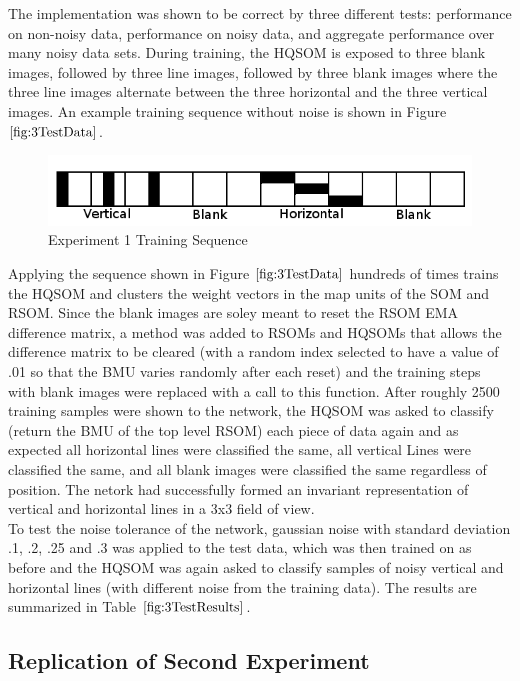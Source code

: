 \documentclass[a4paper,10pt]{article}
\begin{document}
The implementation was shown to be correct by three different tests: performance on non-noisy
data, performance on noisy data, and aggregate performance over many noisy data sets. During
training, the HQSOM is exposed to three blank images, followed by three line images, followed by
three blank images where the three line images alternate between the three horizontal and the three
vertical images. An example training sequence without noise is shown in Figure
$\ref{fig:3TestData}$.
\begin{figure}[ht]
\begin{center} 
 \includegraphics[scale=.3]{./exp1_dataset.png}
\end{center} 
\caption{Experiment 1 Training Sequence}
\label{fig:3TestData}
\end{figure} 
Applying the sequence shown in Figure $\ref{fig:3TestData}$ hundreds of times trains the HQSOM and
clusters the weight vectors in the map units of the SOM and RSOM.  Since the blank images are
soley meant to reset the RSOM EMA difference matrix, a method was added to RSOMs and HQSOMs that
allows the difference matrix to be cleared (with a random index selected to have a value of .01 so
that the BMU varies randomly after each reset) and the training steps with blank images were
replaced with a call to this function. After roughly 2500 training samples were shown to the
network, the HQSOM was asked to classify (return the BMU of the top level RSOM) each piece of data
again and as expected all horizontal lines were classified the same, all vertical Lines were
classified the same, and all blank images were classified the same regardless of position.  The
netork had successfully formed an invariant representation of vertical and horizontal lines in a
3x3 field of view.
\\
To test the noise tolerance of the network, gaussian noise with standard deviation .1, .2, .25 and
.3 was applied to the test data, which was then trained on as before and the HQSOM was again asked
to classify samples of noisy vertical and horizontal lines (with different noise from the training
data).  The results are summarized in Table $\ref{fig:3TestResults}$.
 

\subsection{Replication of Second Experiment}
\end{document}
